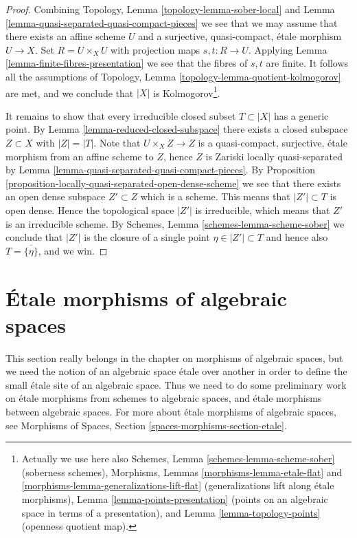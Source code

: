 \begin{proof}
Combining
Topology, Lemma \ref{topology-lemma-sober-local}
and
Lemma \ref{lemma-quasi-separated-quasi-compact-pieces}
we see that we may assume that there exists an affine scheme $U$
and a surjective, quasi-compact, \'etale morphism $U \to X$.
Set $R = U \times_X U$ with projection maps $s, t : R \to U$. Applying
Lemma \ref{lemma-finite-fibres-presentation}
we see that the fibres of $s, t$ are finite. It follows all the assumptions of
Topology, Lemma \ref{topology-lemma-quotient-kolmogorov}
are met, and we conclude that $|X|$ is Kolmogorov\footnote{
Actually we use here also
Schemes, Lemma \ref{schemes-lemma-scheme-sober} (soberness schemes),
Morphisms, Lemmas \ref{morphisms-lemma-etale-flat}
and \ref{morphisms-lemma-generalizations-lift-flat} (generalizations
lift along \'etale morphisms),
Lemma \ref{lemma-points-presentation} (points on an algebraic space in
terms of a presentation), and
Lemma \ref{lemma-topology-points} (openness quotient map).}.

\medskip\noindent
It remains to show that every irreducible closed subset
$T \subset |X|$ has a generic point. By
Lemma \ref{lemma-reduced-closed-subspace}
there exists a closed subspace $Z \subset X$ with $|Z| = |T|$.
Note that $U \times_X Z \to Z$ is a quasi-compact, surjective, \'etale
morphism from an affine scheme to $Z$, hence $Z$ is Zariski locally
quasi-separated by
Lemma \ref{lemma-quasi-separated-quasi-compact-pieces}.
By
Proposition \ref{proposition-locally-quasi-separated-open-dense-scheme}
we see that there exists an open dense subspace $Z' \subset Z$
which is a scheme. This means that $|Z'| \subset T$ is open dense.
Hence the topological space $|Z'|$ is irreducible, which means that
$Z'$ is an irreducible scheme. By
Schemes, Lemma \ref{schemes-lemma-scheme-sober}
we conclude that $|Z'|$ is the closure of a single point
$\eta \in |Z'| \subset T$ and hence also $T = \overline{\{\eta\}}$, and we win.
\end{proof}








\section{\'Etale morphisms of algebraic spaces}
\label{section-etale-morphisms}

\noindent
This section really belongs in the chapter on morphisms of algebraic
spaces, but we need the notion of an algebraic space \'etale over another
in order to define the small \'etale site of an algebraic space.
Thus we need to do some preliminary work on \'etale morphisms from schemes to
algebraic spaces, and \'etale morphisms between algebraic spaces.
For more about \'etale morphisms of algebraic spaces, see
Morphisms of Spaces, Section \ref{spaces-morphisms-section-etale}.

